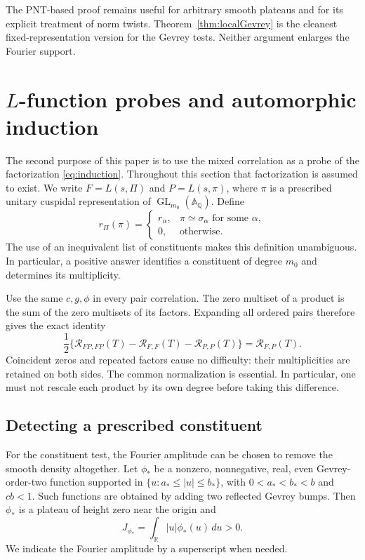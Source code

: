 \documentclass[11pt]{article}
\numberwithin{equation}{section}
\theoremstyle{remark}
\newcommand{\R}{\mathbb R}
\newcommand{\Q}{\mathbb Q}
\newcommand{\GL}{\operatorname{GL}}
\begin{document}
The PNT-based proof remains useful for arbitrary smooth plateaus and
for its explicit treatment of norm twists. Theorem~\ref{thm:localGevrey}
is the cleanest fixed-representation version for the Gevrey tests.
Neither argument enlarges the Fourier support.


\section{\texorpdfstring{$L$}{L}-function probes and automorphic induction}
\label{sec:probes}

The second purpose of this paper is to use the mixed correlation as a
probe of the factorization \eqref{eq:induction}.  Throughout this section
that factorization is assumed to exist.  We write $F=L(s,\Pi)$ and
$P=L(s,\pi)$, where $\pi$ is a prescribed unitary cuspidal representation
of $\GL_{m_0}(\mathbb A_\Q)$.  Define
\[
 r_\Pi(\pi)=
 \begin{cases}
 r_\alpha,&\pi\simeq\sigma_\alpha\text{ for some }\alpha,\\
 0,&\text{otherwise}.
 \end{cases}
\]
The use of an inequivalent list of constituents makes this definition
unambiguous.  In particular, a positive answer identifies a constituent
of degree $m_0$ and determines its multiplicity.

Use the same $c,g,\phi$ in every pair correlation.  The zero multiset of
a product is the sum of the zero multisets of its factors.  Expanding
all ordered pairs therefore gives the exact identity
\begin{equation}\label{eq:productidentity}
 \frac12\{\mathcal R_{FP,FP}(T)-\mathcal R_{F,F}(T)
                         -\mathcal R_{P,P}(T)\}
 =\mathcal R_{F,P}(T).
\end{equation}
Coincident zeros and repeated factors cause no difficulty: their
multiplicities are retained on both sides.  The common normalization is
essential.  In particular, one must not rescale each product by its own
degree before taking this difference.

\subsection{Detecting a prescribed constituent}

For the constituent test, the Fourier amplitude can be chosen to remove
the smooth density altogether.  Let $\phi_*$ be a nonzero, nonnegative,
real, even Gevrey-order-two function supported in
$\{u: a_*\le |u|\le b_*\}$, with $0<a_*<b_*<b$ and $cb<1$.
Such functions are obtained by adding two reflected Gevrey bumps.
Then $\phi_*$ is a plateau of height zero near the origin and
\[
 J_{\phi_*}=\int_\R |u|\phi_*(u)\,du>0.
\]
We indicate the Fourier amplitude by a superscript when needed.
\end{document}
